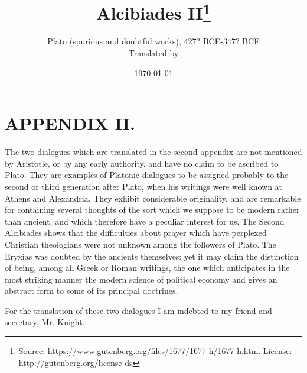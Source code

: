 \documentclass[11pt,letter]{article}
\begin{document}
\title{Alcibiades II\thanks{Source: https://www.gutenberg.org/files/1677/1677-h/1677-h.htm. License: http://gutenberg.org/license ds}}
\date{\today}
\author{Plato (spurious and doubtful works), 427? BCE-347? BCE\\ Translated by }
\maketitle

\setcounter{tocdepth}{1}
\tableofcontents
\renewcommand{\baselinestretch}{1.0}
\normalsize
\newpage

\section{
      APPENDIX II.
    }
\par  The two dialogues which are translated in the second appendix are not mentioned by Aristotle, or by any early authority, and have no claim to be ascribed to Plato. They are examples of Platonic dialogues to be assigned probably to the second or third generation after Plato, when his writings were well known at Athens and Alexandria. They exhibit considerable originality, and are remarkable for containing several thoughts of the sort which we suppose to be modern rather than ancient, and which therefore have a peculiar interest for us. The Second Alcibiades shows that the difficulties about prayer which have perplexed Christian theologians were not unknown among the followers of Plato. The Eryxias was doubted by the ancients themselves: yet it may claim the distinction of being, among all Greek or Roman writings, the one which anticipates in the most striking manner the modern science of political economy and gives an abstract form to some of its principal doctrines.

\par  For the translation of these two dialogues I am indebted to my friend and secretary, Mr. Knight.
\end{document}

